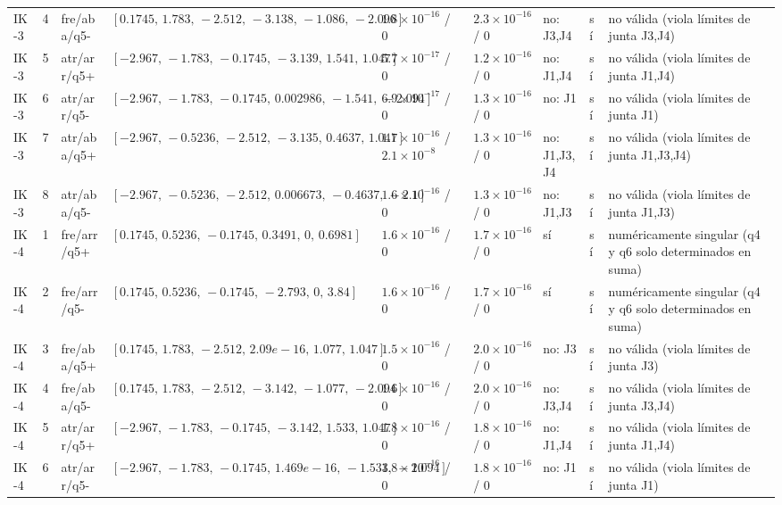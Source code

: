 \begin{longtable}{lcllllllp{5.2cm}}
IK-3 & 4 & fre/aba/q5- & $[0.1745,\,1.783,\,-2.512,\,-3.138,\,-1.086,\,-2.096]$ & $1.8\times10^{-16}$ / $0$ & $2.3\times10^{-16}$ / $0$ & no: J3,J4 & sí & no v\'alida (viola l\'imites de junta J3,J4) \\
IK-3 & 5 & atr/arr/q5+ & $[-2.967,\,-1.783,\,-0.1745,\,-3.139,\,1.541,\,1.047]$ & $5.7\times10^{-17}$ / $0$ & $1.2\times10^{-16}$ / $0$ & no: J1,J4 & sí & no v\'alida (viola l\'imites de junta J1,J4) \\
IK-3 & 6 & atr/arr/q5- & $[-2.967,\,-1.783,\,-0.1745,\,0.002986,\,-1.541,\,-2.094]$ & $6.9\times10^{-17}$ / $0$ & $1.3\times10^{-16}$ / $0$ & no: J1 & sí & no v\'alida (viola l\'imites de junta J1) \\
IK-3 & 7 & atr/aba/q5+ & $[-2.967,\,-0.5236,\,-2.512,\,-3.135,\,0.4637,\,1.041]$ & $1.7\times10^{-16}$ / $2.1\times10^{-8}$ & $1.3\times10^{-16}$ / $0$ & no: J1,J3,J4 & sí & no v\'alida (viola l\'imites de junta J1,J3,J4) \\
IK-3 & 8 & atr/aba/q5- & $[-2.967,\,-0.5236,\,-2.512,\,0.006673,\,-0.4637,\,-2.1]$ & $1.6\times10^{-16}$ / $0$ & $1.3\times10^{-16}$ / $0$ & no: J1,J3 & sí & no v\'alida (viola l\'imites de junta J1,J3) \\
IK-4 & 1 & fre/arr/q5+ & $[0.1745,\,0.5236,\,-0.1745,\,0.3491,\,0,\,0.6981]$ & $1.6\times10^{-16}$ / $0$ & $1.7\times10^{-16}$ / $0$ & s\'i & sí & num\'ericamente singular (q4 y q6 solo determinados en suma) \\
IK-4 & 2 & fre/arr/q5- & $[0.1745,\,0.5236,\,-0.1745,\,-2.793,\,0,\,3.84]$ & $1.6\times10^{-16}$ / $0$ & $1.7\times10^{-16}$ / $0$ & s\'i & sí & num\'ericamente singular (q4 y q6 solo determinados en suma) \\
IK-4 & 3 & fre/aba/q5+ & $[0.1745,\,1.783,\,-2.512,\,2.09e-16,\,1.077,\,1.047]$ & $1.5\times10^{-16}$ / $0$ & $2.0\times10^{-16}$ / $0$ & no: J3 & sí & no v\'alida (viola l\'imites de junta J3) \\
IK-4 & 4 & fre/aba/q5- & $[0.1745,\,1.783,\,-2.512,\,-3.142,\,-1.077,\,-2.094]$ & $1.6\times10^{-16}$ / $0$ & $2.0\times10^{-16}$ / $0$ & no: J3,J4 & sí & no v\'alida (viola l\'imites de junta J3,J4) \\
IK-4 & 5 & atr/arr/q5+ & $[-2.967,\,-1.783,\,-0.1745,\,-3.142,\,1.533,\,1.047]$ & $1.8\times10^{-16}$ / $0$ & $1.8\times10^{-16}$ / $0$ & no: J1,J4 & sí & no v\'alida (viola l\'imites de junta J1,J4) \\
IK-4 & 6 & atr/arr/q5- & $[-2.967,\,-1.783,\,-0.1745,\,1.469e-16,\,-1.533,\,-2.094]$ & $1.8\times10^{-16}$ / $0$ & $1.8\times10^{-16}$ / $0$ & no: J1 & sí & no v\'alida (viola l\'imites de junta J1) \\

\end{longtable}
